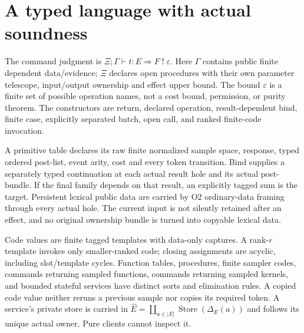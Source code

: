 \documentclass[11pt,a4paper]{article}
\theoremstyle{definition}
\begin{document}
\section{A typed language with actual soundness}\label{sec:language}

The command judgment is
\(\Xi;\Gamma\vdash t:E\Rightarrow F\;!\;\varepsilon\).
Here \(\Gamma\) contains public finite dependent data/evidence;
\(\Xi\) declares open procedures with their own parameter telescope,
input/output ownership and effect upper bound. The bound \(\varepsilon\)
is a finite set of possible operation names, not a cost bound, permission,
or purity theorem. The constructors are return, declared operation,
result-dependent bind, finite case, explicitly separated batch, open call,
and ranked finite-code invocation.

A primitive table declares its raw finite normalized sample space,
response, typed ordered post-list, event arity, cost and every token
transition. Bind supplies a separately typed continuation at each actual
result hole and its actual post-bundle. If the final family depends on
that result, an explicitly tagged sum is the target. Persistent lexical
public data are carried by O2 ordinary-data framing through every actual
hole. The current input is not silently retained after an effect, and
no original ownership bundle is turned into copyable lexical data.

Code values are finite tagged templates with data-only captures. A
rank-\(r\) template invokes only smaller-ranked code; closing assignments
are acyclic, including slot/template cycles. Function tables, procedures,
finite sampler codes, commands returning sampled functions, commands
returning sampled kernels, and bounded stateful services have distinct
sorts and elimination rules. A copied code value neither reruns a
previous sample nor copies its required token. A service's private store
is carried in
\(\widehat E=\coprod_{a\in|E|}\operatorname{Store}(\Delta_E(a))\)
and follows its unique actual owner. Pure clients cannot inspect it.
\end{document}
